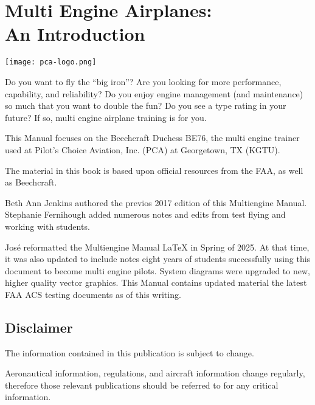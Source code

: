 \newcommand{\vyse}{\textcolor{blue}{$V_{YSE}$ }}
\newcommand{\vmc}{\textcolor{red}{$V_{MC}$ }}
\newcommand{\vxse}{$V_{XSE}$ }

\chapter*{Multi Engine Airplanes:\\An Introduction}

\begin{center}
\texttt{[image: pca-logo.png]}
\end{center}

Do you want to fly the ``big iron''? Are you looking for more performance, capability,
and reliability? Do you enjoy engine management (and maintenance) so much that you want to
double the fun? Do you see a type rating in your future? If so, multi engine airplane training is for you.

This Manual focuses on the Beechcraft Duchess BE76, the multi engine trainer used at Pilot's
Choice Aviation, Inc. (PCA) at Georgetown, TX (KGTU).

The material in this book is based upon official resources from the FAA, as well as Beechcraft.

Beth Ann Jenkins authored the previos 2017 edition of this Multiengine Manual. Stephanie Fernihough
added numerous notes and edits from test flying and working with students.

Jos\'e reformatted the Multiengine Manual \LaTeX{} in Spring of 2025. At that time, it was also
updated to include notes eight years of students successfully using this document to become multi
engine pilots. System diagrams were upgraded to new, higher quality vector graphics. This Manual
contains updated material the latest FAA ACS testing documents as of this writing.

\newpage

\section*{Disclaimer}

The information contained in this publication is subject to change.

Aeronautical information, regulations, and aircraft information change regularly, therefore those relevant
publications should be referred to for any critical information.

